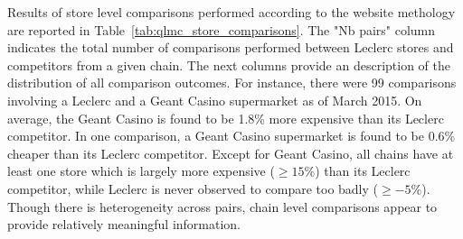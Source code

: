 \documentclass[english]{article}
\begin{document}
Results of store level comparisons performed according to the website methology are reported in Table~\ref{tab:qlmc_store_comparisons}. The "Nb pairs" column indicates the total number of comparisons performed between Leclerc stores and competitors from a given chain. The next columns provide an description of the distribution of all comparison outcomes. For instance, there were 99 comparisons involving a Leclerc and a Geant Casino supermarket as of March 2015. On average, the Geant Casino is found to be 1.8\% more expensive than its Leclerc competitor. In one comparison, a Geant Casino supermarket is found to be 0.6\% cheaper than its Leclerc competitor. Except for Geant Casino, all chains have at least one store which is largely more expensive ($\ge 15\%$) than its Leclerc competitor, while Leclerc is never observed to compare too badly ($\ge -5 \%$). Though there is heterogeneity across pairs, chain level comparisons appear to provide relatively meaningful information.
\end{document}
